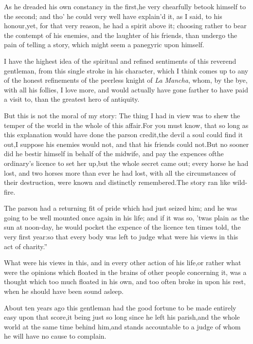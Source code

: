 \documentclass{article}
\begin{document}
As he dreaded his own constancy in the first,\tsk  he very
chearfully betook himself to the second; and tho’ he could very
well have explain’d it, as I said, to his honour,\tsk  yet, for
that very reason, he had a spirit above it; choosing rather to bear
the contempt of his enemies, and the laughter of his friends, than
undergo the pain of telling a story, which might seem a panegyric
upon himself.

I have the highest idea of the spiritual and refined sentiments
of this reverend gentleman, from this single stroke in his character, which I think comes up to any of the
honest refinements of the peerless knight of \textit{La Mancha},
whom, by the bye, with all his follies, I love more, and would
actually have gone farther to have paid a visit to, than the
greatest hero of antiquity.

But this is not the moral of my story: The thing I had in view
was to shew the temper of the world in the whole of this
affair.\tsk  For you must know, that so long as this explanation
would have done the parson credit,\tsk  the devil a soul could
find it out,\tsk  I suppose his enemies would not, and that his
friends could not.\tsh  But no sooner did he bestir himself in
behalf of the midwife, and pay the expences of\pb the ordinary’s
licence to set her up,\tsk  but the whole secret came out; every
horse he had lost, and two horses more than ever he had lost,
with all the circumstances of their destruction, were known and
distinctly remembered.\tsk  The story ran like wild-fire.\tsk
\begin{story}{The parson had}
a returning fit of pride which had just seized
him; and he was going to be well mounted once again in his life;
and if it was so, ’twas plain as the sun at noon-day, he would
pocket the expence of the licence ten times told, the very first
year:\tsk  so that every body was left to judge what were his
views in this act of charity.”
\end{story}

\vspace\parskip
What were his views in this, and in every other action of his
life,\tsk  or rather what were the opinions which floated in the
brains of other people concerning it, was a thought which too much
floated in his own, and too often broke in upon his rest, when he
should have been sound asleep.

About ten years ago this gentleman had the good fortune to be
made entirely easy upon that score,\tsk  it being just so long
since he left his parish,\tsk  and the whole world at the same
time behind him,\tsk  and stands accountable to a judge of whom he
will have no cause to complain.
\end{document}
